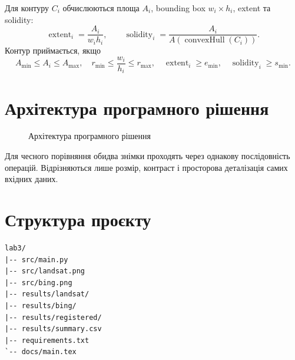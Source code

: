 \documentclass[12pt,a4paper]{article}
\begin{document}
Для контуру \(C_i\) обчислюються площа \(A_i\), bounding box \(w_i\times h_i\), extent та solidity:
\begin{equation}
\operatorname{extent}_i=\frac{A_i}{w_i h_i},\qquad
\operatorname{solidity}_i=\frac{A_i}{A(\operatorname{convexHull}(C_i))}.
\end{equation}
Контур приймається, якщо
\begin{equation}
A_{\min}\leq A_i\leq A_{\max},\quad r_{\min}\leq\frac{w_i}{h_i}\leq r_{\max},\quad
\operatorname{extent}_i\geq e_{\min},\quad\operatorname{solidity}_i\geq s_{\min}.
\end{equation}

\section{Архітектура програмного рішення}
\begin{figure}[H]\centering
{}
\caption{Архітектура програмного рішення}
\end{figure}

Для чесного порівняння обидва знімки проходять через однакову послідовність операцій. Відрізняються лише розмір, контраст і просторова деталізація самих вхідних даних.

\section{Структура проєкту}
\begin{verbatim}
lab3/
|-- src/main.py
|-- src/landsat.png
|-- src/bing.png
|-- results/landsat/
|-- results/bing/
|-- results/registered/
|-- results/summary.csv
|-- requirements.txt
`-- docs/main.tex
\end{verbatim}
\end{document}
